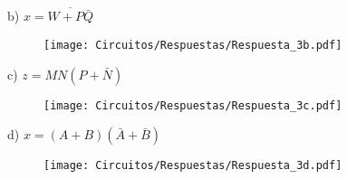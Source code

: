 \documentclass[a4paper, 12pt]{article}
\newcommand{\Aspace}{0.2cm}
\begin{document}
\begin{enumerate}
            \vspace{\Aspace} \par
            b) $x = \overline{W + P\bar{Q}}$
            \\ { \color{azul} 
                \begin{figure}[!ht]
                    \centering
                    \texttt{[image: Circuitos/Respuestas/Respuesta\_3b.pdf]}
                \end{figure}
            }

            \vspace{\Aspace} \par
            c) $z = MN(P + \bar{N})$
            \\ { \color{azul} 
                \begin{figure}[!ht]
                    \centering
                    \texttt{[image: Circuitos/Respuestas/Respuesta\_3c.pdf]}
                \end{figure}
            }

            \vspace{\Aspace} \par
            d) $x = (A + B)(\bar{A} + \bar{B})$
            \\ { \color{azul} 
                \begin{figure}[!ht]
                    \centering
                    \texttt{[image: Circuitos/Respuestas/Respuesta\_3d.pdf]}
                \end{figure}
            }




\end{enumerate}
\end{document}
